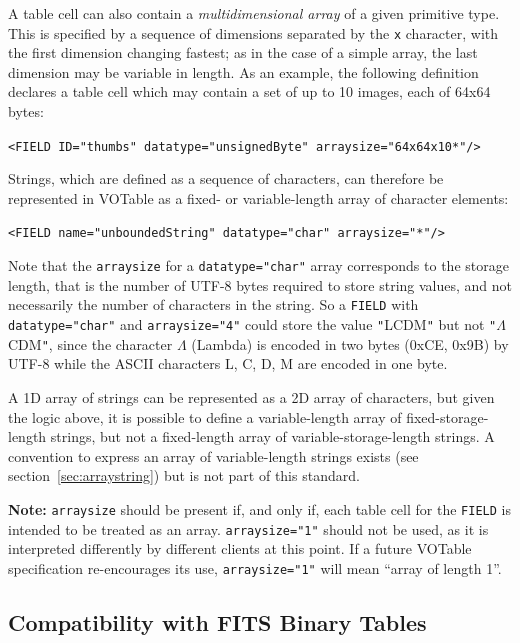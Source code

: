 \documentclass[11pt,a4paper]{ivoa}
\def\Aref#1{section~\ref{#1}}
\let\fg=\color
\def\slash {{\fg{blue}/}}
\def\attr#1{{\tt{\fg{DarkRed}#1}}}
\def\elem#1{{\tt{\fg{DarkRed}#1}}}
\def\attrval#1#2{{\tt{\fg{DarkRed}#1}="{\fg{DarkPurple}#2}"}}
\def\elemdef#1#2{{\tt\fg{blue}<}{\tt{\fg{DarkRed}#1}#2}{\tt\fg{blue}>}}
\def\literalvalue#1{{\tt"}{{\fg{DarkPurple}#1}}{\tt"}}
\begin{document}
A table cell can also contain a {\em multidimensional array}
of a given primitive type. This is specified by a sequence of dimensions
separated by the {\tt x} character,
with the first dimension changing fastest; as in the case
of a simple array, the last dimension may be variable in length.
As an example, the following definition
declares a table cell which may contain a set of up to 10 images,
each of 64x64 bytes:

\elemdef{FIELD}{ \attrval{ID}{thumbs} \attrval{datatype}{unsignedByte}
  \attrval{arraysize}{64x64x10*}\slash}

Strings, which are defined as a sequence of characters,
can therefore be represented in VOTable as a fixed- or variable-length
array of character elements:

\elemdef{FIELD}{ \attrval{name}{unboundedString} \attrval{datatype}{char}
       \attrval{arraysize}{*}\slash}

Note that the \attr{arraysize} for a \attrval{datatype}{char}
array corresponds to the storage length,
that is the number of UTF-8 bytes required to store string values,
and not necessarily the number of characters in the string.
So a \elem{FIELD} with \attrval{datatype}{char} and \attrval{arraysize}{4}
could store the value \literalvalue{LCDM}
but not \literalvalue{$\Lambda$CDM},
since the character $\Lambda$ (Lambda)
is encoded in two bytes (0xCE, 0x9B) by UTF-8
while the ASCII characters L, C, D, M are encoded in one byte.

A 1D array of strings can be represented as a 2D array of characters, but
given the logic above, it is possible to define a variable-length array
of fixed-storage-length strings,
but not a fixed-length array of variable-storage-length strings.
A convention to express an array of variable-length strings
exists (see \Aref{sec:arraystring}) but is not
part of this standard.

\textbf{Note:} \attr{arraysize} should be present if, and only if, each table
cell for the \elem{FIELD} is intended to be treated as an array.
\attrval{arraysize}{1}
should not be used, as it is interpreted differently by different
clients at this point. If a future VOTable specification re-encourages
its use, \attrval{arraysize}{1} will mean ``array of length 1''.

\subsection{Compatibility with FITS Binary Tables}
\end{document}
